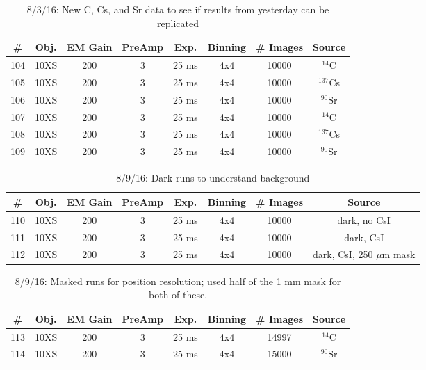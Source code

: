 \documentclass[12pt]{amsart}
\begin{document}
\begin{table}[!htbp]
	\centering
	\caption{8/3/16: New C, Cs, and Sr data to see if results from yesterday can be replicated}
	\label{tab:table19}
	\hspace*{-1cm}
	\begin{tabular}{cccccccc}
	\toprule
	\# & Obj. & EM Gain & PreAmp & Exp. & Binning & \# Images & Source\\
	\midrule
	104 & 10XS & 200 & 3 & 25 ms & 4x4 & 10000 & $^{14}$C\\
	105 & 10XS & 200 & 3 & 25 ms & 4x4 & 10000 & $^{137}$Cs\\
	106 & 10XS & 200 & 3 & 25 ms & 4x4 & 10000 & $^{90}$Sr\\
	107 & 10XS & 200 & 3 & 25 ms & 4x4 & 10000 & $^{14}$C\\
	108 & 10XS & 200 & 3 & 25 ms & 4x4 & 10000 & $^{137}$Cs\\
	109 & 10XS & 200 & 3 & 25 ms & 4x4 & 10000 & $^{90}$Sr\\
	\bottomrule
	\end{tabular}
	\hspace*{-1cm}
\end{table}

\begin{table}[!htbp]
	\centering
	\caption{8/9/16: Dark runs to understand background}
	\label{tab:table20}
	\hspace*{-1cm}
	\begin{tabular}{cccccccc}
	\toprule
	\# & Obj. & EM Gain & PreAmp & Exp. & Binning & \# Images & Source\\
	\midrule
	110 & 10XS & 200 & 3 & 25 ms & 4x4 & 10000 & dark, no CsI\\
	111 & 10XS & 200 & 3 & 25 ms & 4x4 & 10000 & dark, CsI\\
	112 & 10XS & 200 & 3 & 25 ms & 4x4 & 10000 & dark, CsI, 250 $\mu$m mask\\
	\bottomrule
	\end{tabular}
	\hspace*{-1cm}
\end{table}

\begin{table}[!htbp]
	\centering
	\caption{8/9/16: Masked runs for position resolution; used half of the 1 mm mask for both of these.}
	\label{tab:table21}
	\hspace*{-1cm}
	\begin{tabular}{cccccccc}
	\toprule
	\# & Obj. & EM Gain & PreAmp & Exp. & Binning & \# Images & Source\\
	\midrule
	113 & 10XS & 200 & 3 & 25 ms & 4x4 & 14997 & $^{14}$C\\
	114 & 10XS & 200 & 3 & 25 ms & 4x4 & 15000 & $^{90}$Sr\\
	\bottomrule
	\end{tabular}
	\hspace*{-1cm}
\end{table}
\end{document}
